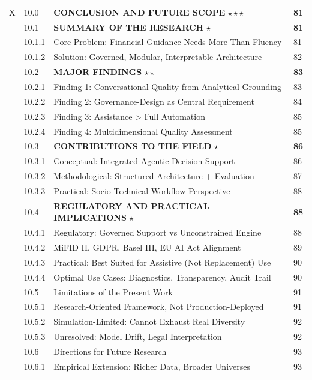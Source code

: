 \documentclass[11pt]{article}
\begin{document}
\begin{longtable}{C{0.8cm}C{1.2cm}L{9.7cm}C{1.2cm}}
X & 10.0 & \textbf{CONCLUSION AND FUTURE SCOPE} $\star\star\star$ & \textbf{81} \\
 & 10.1 & \textbf{SUMMARY OF THE RESEARCH} $\star$ & \textbf{81} \\
 & 10.1.1 & Core Problem: Financial Guidance Needs More Than Fluency & 81 \\
 & 10.1.2 & Solution: Governed, Modular, Interpretable Architecture & 82 \\
 & 10.2 & \textbf{MAJOR FINDINGS} $\star\star$ & \textbf{83} \\
 & 10.2.1 & Finding 1: Conversational Quality from Analytical Grounding & 83 \\
 & 10.2.2 & Finding 2: Governance-Design as Central Requirement & 84 \\
 & 10.2.3 & Finding 3: Assistance > Full Automation & 85 \\
 & 10.2.4 & Finding 4: Multidimensional Quality Assessment & 85 \\
 & 10.3 & \textbf{CONTRIBUTIONS TO THE FIELD} $\star$ & \textbf{86} \\
 & 10.3.1 & Conceptual: Integrated Agentic Decision-Support & 86 \\
 & 10.3.2 & Methodological: Structured Architecture + Evaluation & 87 \\
 & 10.3.3 & Practical: Socio-Technical Workflow Perspective & 88 \\
 & 10.4 & \textbf{REGULATORY AND PRACTICAL IMPLICATIONS} $\star$ & \textbf{88} \\
 & 10.4.1 & Regulatory: Governed Support vs Unconstrained Engine & 88 \\
 & 10.4.2 & MiFID II, GDPR, Basel III, EU AI Act Alignment & 89 \\
 & 10.4.3 & Practical: Best Suited for Assistive (Not Replacement) Use & 90 \\
 & 10.4.4 & Optimal Use Cases: Diagnostics, Transparency, Audit Trail & 90 \\
 & 10.5 & Limitations of the Present Work & 91 \\
 & 10.5.1 & Research-Oriented Framework, Not Production-Deployed & 91 \\
 & 10.5.2 & Simulation-Limited: Cannot Exhaust Real Diversity & 92 \\
 & 10.5.3 & Unresolved: Model Drift, Legal Interpretation & 92 \\
 & 10.6 & Directions for Future Research & 93 \\
 & 10.6.1 & Empirical Extension: Richer Data, Broader Universes & 93 \\

\end{longtable}
\end{document}
